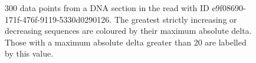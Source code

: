 \begin{figure}
\centering

\caption{\label{fig:epsilon}300 data points from a DNA section in the read with ID e9f08690-171f-476f-9119-5330d0290126. The greatest strictly increasing or decreasing sequences are coloured by their maximum absolute delta. Those with a maximum absolute delta greater than 20 are labelled by this value.}
\end{figure}
